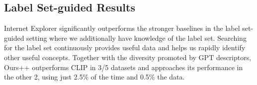 \subsection{Label Set-guided Results}
Internet Explorer significantly outperforms the stronger baselines in the label set-guided setting where we additionally have knowledge of the label set. Searching for the label set continuously provides useful data and helps us rapidly identify other useful concepts. Together with the diversity promoted by GPT descriptors, Ours++ outperforms CLIP in 3/5 datasets and approaches its performance in the other 2, using just 2.5\% of the time and 0.5\% the data.


